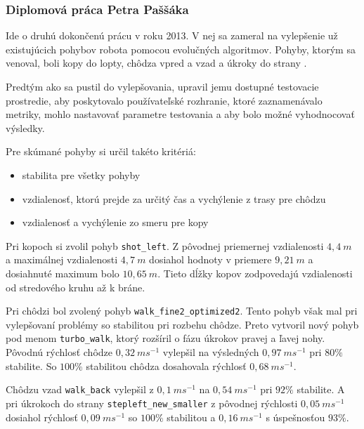 \subsubsection{Diplomová práca Petra Paššáka} \label{sec_passakp}
Ide o druhú dokončenú prácu v roku 2013. V nej sa zameral na vylepšenie už existujúcich pohybov robota pomocou evolučných algoritmov. Pohyby, ktorým sa venoval, boli kopy do lopty, chôdza vpred a vzad a úkroky do strany \cite{passak_peter}.

Predtým ako sa pustil do vylepšovania, upravil jemu dostupné testovacie prostredie, aby poskytovalo používateľské rozhranie, ktoré zaznamenávalo metriky, mohlo nastavovať parametre testovania a aby bolo možné vyhodnocovať výsledky.

Pre skúmané pohyby si určil takéto kritériá:
\begin{itemize}
	\item stabilita pre všetky pohyby
	\item vzdialenosť, ktorú prejde za určitý čas a vychýlenie z trasy pre chôdzu
	\item vzdialenosť a vychýlenie zo smeru pre kopy
\end{itemize}

Pri kopoch si zvolil pohyb \texttt{shot\_left}. Z pôvodnej priemernej vzdialenosti $4,4~m$ a maximálnej vzdialenosti $4,7~m$ dosiahol hodnoty v priemere $9,21~m$ a dosiahnuté maximum bolo $10,65~m$. Tieto dĺžky kopov zodpovedajú vzdialenosti od stredového kruhu až k bráne.

Pri chôdzi bol zvolený pohyb \texttt{walk\_fine2\_optimized2}. Tento pohyb však mal pri vylepšovaní problémy so stabilitou pri rozbehu chôdze. Preto vytvoril nový pohyb pod menom \texttt{turbo\_walk}, ktorý rozšíril o fázu úkrokov pravej a ľavej nohy. Pôvodnú rýchlosť chôdze $0,32~ms^{-1}$ vylepšil na výsledných $0,97~ms^{-1}$ pri  $80\%$ stabilite. So $100\%$ stabilitou chôdza dosahovala rýchlosť $0,68~ms^{-1}$.

Chôdzu vzad \texttt{walk\_back} vylepšil z $0,1~ms^{-1}$ na $0,54~ms^{-1}$ pri $92\%$ stabilite. A pri úkrokoch do strany \texttt{stepleft\_new\_smaller} z pôvodnej rýchlosti $0,05~ms^{-1}$ dosiahol rýchlosť $0,09~ms^{-1}$ so $100\%$ stabilitou a $0,16~ms^{-1}$ s úspešnosťou $93\%$.